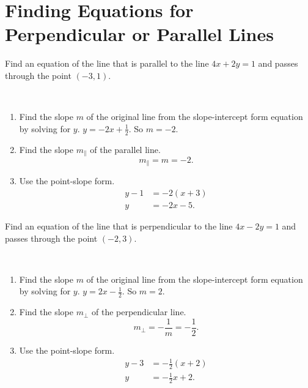 \documentclass[en,11pt]{elegantbook}
\newcommand{\parll}{ {\mathbin{\parallel}} }
\let\BeginKnitrBlock\begin \let\EndKnitrBlock\end
\begin{document}
\hypertarget{finding-equations-for-perpendicular-or-parallel-lines}{%
\section{Finding Equations for Perpendicular or Parallel Lines}\label{finding-equations-for-perpendicular-or-parallel-lines}}

\BeginKnitrBlock{example}
\protect\hypertarget{exm:unnamed-chunk-237}{}{\label{exm:unnamed-chunk-237} }
Find an equation of the line that is parallel to the line \(4x+2y=1\) and passes through the point \((-3, 1)\).
\EndKnitrBlock{example}

\BeginKnitrBlock{solution}
{}\\

\begin{enumerate}
\def\labelenumi{\arabic{enumi}.}

\item
  Find the slope \(m\) of the original line from the slope-intercept form equation by solving for \(y\). \(y=-2x+\frac12\). So \(m=-2\).
\item
  Find the slope \(m_\parll\) of the parallel line.
  \[m_\parll=m=-2.\]
\item
  Use the point-slope form.
  \[
       \begin{aligned}
           y-1&=-2(x+3)\\
           y&=-2x-5.
       \end{aligned}
   \]
\end{enumerate}
\EndKnitrBlock{solution}

\BeginKnitrBlock{example}
\protect\hypertarget{exm:unnamed-chunk-239}{}{\label{exm:unnamed-chunk-239} }
Find an equation of the line that is perpendicular to the line \(4x-2y=1\) and passes through the point \((-2,3)\).
\EndKnitrBlock{example}

\BeginKnitrBlock{solution}
{}\\

\begin{enumerate}
\def\labelenumi{\arabic{enumi}.}

\item
  Find the slope \(m\) of the original line from the slope-intercept form equation by solving for \(y\). \(y=2x-\frac12\). So \(m=2\).
\item
  Find the slope \(m_\perp\) of the perpendicular line.
  \[m_\perp=-\frac1m=-\frac12.\]
\item
  Use the point-slope form.
  \[
       \begin{aligned}
           y-3&=-\frac12(x+2)\\
           y&=-\frac{1}{2}x+2.
       \end{aligned}
   \]
\end{enumerate}
\EndKnitrBlock{solution}
\end{document}
